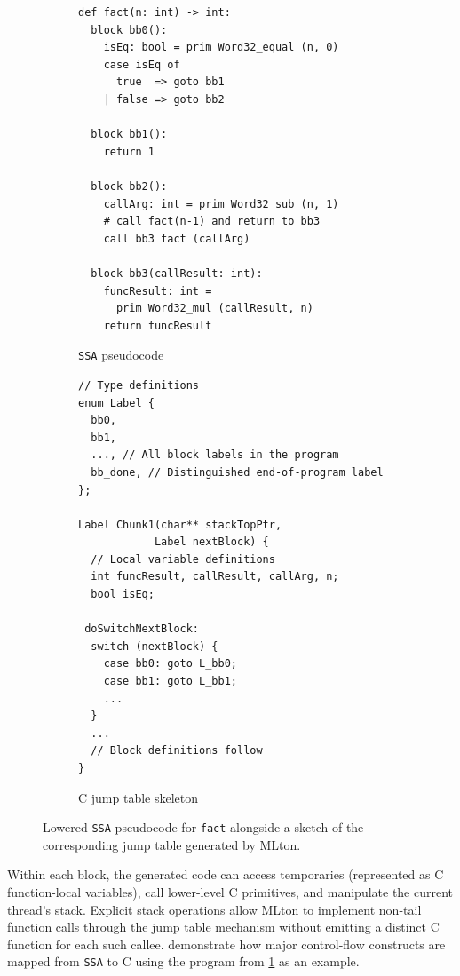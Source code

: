 \begin{figure}[htbp]
  \centering
  \begin{subfigure}[t]{0.48\textwidth}
    \caption{\texttt{SSA} pseudocode}
    \label{fig:chunk_ssa}
    \label{fig:ssa_pseudo_small}
    \vspace{1mm}
\begin{verbatim}
def fact(n: int) -> int:
  block bb0():
    isEq: bool = prim Word32_equal (n, 0)
    case isEq of
      true  => goto bb1
    | false => goto bb2

  block bb1():
    return 1

  block bb2():
    callArg: int = prim Word32_sub (n, 1)
    # call fact(n-1) and return to bb3
    call bb3 fact (callArg)

  block bb3(callResult: int):
    funcResult: int =
      prim Word32_mul (callResult, n)
    return funcResult
\end{verbatim}
  \end{subfigure}\hfill
  \begin{subfigure}[t]{0.48\textwidth}
    \caption{C jump table skeleton}
    \label{fig:chunk_func}
    \vspace{1mm}
\begin{verbatim}
// Type definitions
enum Label {
  bb0,
  bb1,
  ..., // All block labels in the program
  bb_done, // Distinguished end-of-program label
};

Label Chunk1(char** stackTopPtr,
            Label nextBlock) {
  // Local variable definitions
  int funcResult, callResult, callArg, n;
  bool isEq;

 doSwitchNextBlock:
  switch (nextBlock) {
    case bb0: goto L_bb0;
    case bb1: goto L_bb1;
    ...
  }
  ...
  // Block definitions follow
}
\end{verbatim}
  \end{subfigure}
  \caption{Lowered \texttt{SSA} pseudocode for \texttt{fact} alongside a sketch of the corresponding jump table generated by MLton.}
  \label{fig:pseudo_small}
\end{figure}

Within each block, the generated code can access temporaries (represented as C
function-local variables), call lower-level C primitives, and manipulate the
current thread's stack. Explicit stack operations allow MLton to implement
non-tail function calls through the jump table mechanism without emitting a
distinct C function for each such callee.
demonstrate how major control-flow constructs are mapped from \texttt{SSA} to C
using the program from \cref{fig:ssa_pseudo_small} as an example.

